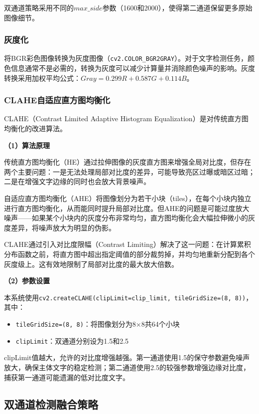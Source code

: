 \documentclass[12pt,hyperref,a4paper,UTF8]{ctexart}
\begin{document}
双通道策略采用不同的$max\_side$参数（1600和2000），使得第二通道保留更多原始图像细节。

\subsubsection{灰度化}

将BGR彩色图像转换为灰度图像（\texttt{cv2.COLOR\_BGR2GRAY}）。对于文字检测任务，颜色信息通常不是必需的，转换为灰度可以减少计算量并消除颜色噪声的影响。灰度转换采用加权平均公式：$Gray = 0.299R + 0.587G + 0.114B$。

\subsubsection{CLAHE自适应直方图均衡化}

CLAHE（Contrast Limited Adaptive Histogram Equalization）是对传统直方图均衡化的改进算法。

\textbf{（1）算法原理}

传统直方图均衡化（HE）通过拉伸图像的灰度直方图来增强全局对比度，但存在两个主要问题：一是无法处理局部对比度的差异，可能导致亮区过曝或暗区过暗；二是在增强文字边缘的同时也会放大背景噪声。

自适应直方图均衡化（AHE）将图像划分为若干小块（tiles），在每个小块内独立进行直方图均衡化，从而能同时提升局部对比度。但AHE的问题是可能过度放大噪声——如果某个小块内的灰度分布非常均匀，直方图均衡化会大幅拉伸微小的灰度差异，将噪声放大为明显的伪影。

CLAHE通过引入对比度限幅（Contrast Limiting）解决了这一问题：在计算累积分布函数之前，将直方图中超出指定阈值的部分裁剪掉，并均匀地重新分配到各个灰度级上。这有效地限制了局部对比度的最大放大倍数。

\textbf{（2）参数设置}

本系统使用\texttt{cv2.createCLAHE(clipLimit=clip\_limit, tileGridSize=(8, 8))}，其中：
\begin{itemize}
    \item \texttt{tileGridSize=(8, 8)}：将图像划分为8×8共64个小块
    \item \texttt{clipLimit}：双通道分别设为1.5和2.5
\end{itemize}

clipLimit值越大，允许的对比度增强越强。第一通道使用1.5的保守参数避免噪声放大，确保主体文字的稳定检测；第二通道使用2.5的较强参数增强边缘对比度，捕获第一通道可能遗漏的低对比度文字。

\subsection{双通道检测融合策略}
\end{document}
